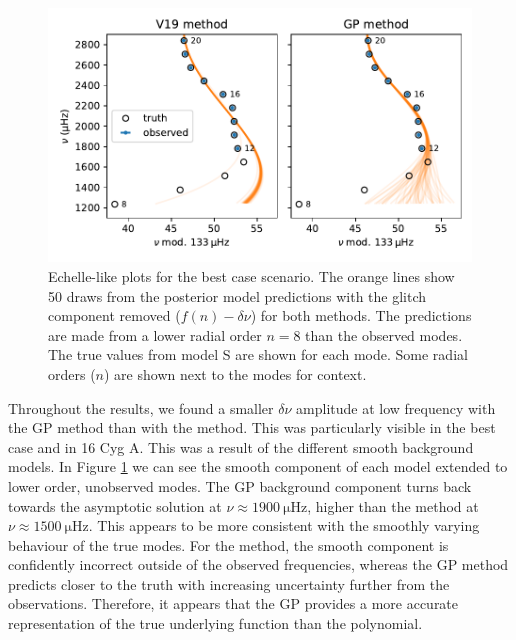 \begin{figure}[!tb]
    \centering
    \includegraphics{figures/glitch-test-smooth.pdf}
    \caption{Echelle-like plots for the best case scenario. The orange lines show 50 draws from the posterior model predictions with the glitch component removed (\(f(n) - \delta\nu\)) for both methods. The predictions are made from a lower radial order \(n=8\) than the observed modes. The true values from model S are shown for each mode. Some radial orders (\(n\)) are shown next to the modes for context.}
    \label{fig:best-smooth}
\end{figure}

Throughout the results, we found a smaller \(\delta\nu\) amplitude at low frequency with the GP method than with the  method. This was particularly visible in the best case and in 16 Cyg A. This was a result of the different smooth background models. In Figure \ref{fig:best-smooth} we can see the smooth component of each model extended to lower order, unobserved modes. The GP background component turns back towards the asymptotic solution at \(\nu \approx \SI{1900}{\micro\hertz}\), higher than the  method at \(\nu \approx \SI{1500}{\micro\hertz}\). This appears to be more consistent with the smoothly varying behaviour of the true modes. For the  method, the smooth component is confidently incorrect outside of the observed frequencies, whereas the GP method predicts closer to the truth with increasing uncertainty further from the observations. Therefore, it appears that the GP provides a more accurate representation of the true underlying function than the polynomial.

